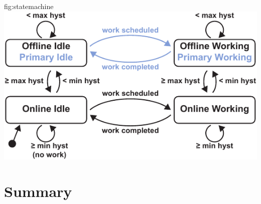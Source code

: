 \begin{definefigure}{fig:statemachine}
    \centering
    \includegraphics[width=\columnwidth]{figs/capacity/model_state_machine}
    \caption{\normalfont Model state machine.
    A modeled device can be in one of four states: \textsf{Offline Idle},
    \textsf{Online Idle}, \textsf{Online Working}, and \textsf{Offline
    Working}. When a device is \textsf{Offline Idle}, it has run out of energy
    and is off. If a device is \textsf{Online
    Idle}, it is on and in deep sleep, ready to perform work if triggered. If
    triggered, a device moves to \textsf{Online Working}, where it performs a
    portion of a work event.  If a workload is atomic, workload events
    \textit{must} be completed in one \textsf{Online Working} step, without any
    transitions to an offline state.  \textsf{Offline Working} means that while
    working on a non-atomic task, the device ran out of energy, checkpointed,
    and is waiting to harvest more and resume its task.  For devices
    configured with a primary-cell, \textsf{Offline Idle} and \textsf{Offline
    Working} become \textsf{\textcolor{primary-blue}{Primary Idle}} and
    \textsf{\textcolor{primary-blue}{Primary Working}} respectively.  In these
    states, outgoing energy is charged against the primary-cell and the device
    remains online and able to perform work for the life of the primary-cell.
    }
\end{definefigure}





\section{Summary}
